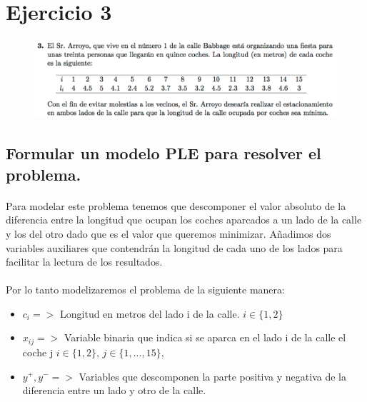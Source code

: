 \documentclass[10pt, a4paper]{article}
\begin{document}
	\section{Ejercicio 3}

        \begin{figure}[H]
        \centering
            \includegraphics[width=\textwidth]{res/exercise-3.png}
        \end{figure}


		\subsection{Formular un modelo PLE para resolver el problema.}

			\paragraph{}
			Para modelar este problema tenemos que descomponer el valor absoluto de la diferencia entre la longitud que ocupan los coches aparcados a un lado de la calle y los del otro dado que es el valor que queremos minimizar. Añadimos dos variables auxiliares que contendrán la longitud de cada uno de los lados para facilitar la lectura de los resultados.

			\paragraph{}
			Por lo tanto modelizaremos el problema de la siguiente manera:

			\begin{itemize}
				\item \(c_{i} => \) Longitud en metros del lado i de la calle. $i \in \{1,2\}$

				\item \(x_{ij} => \) Variable binaria que indica si se aparca en el lado i de la calle el coche j  $i \in \{1,2\}$, $j \in \{1,...,15\}$,

				\item \(y^{+}, y^{-} => \) Variables que descomponen la parte positiva y negativa de la diferencia entre un lado y otro de la calle.
			\end{itemize}
\end{document}
